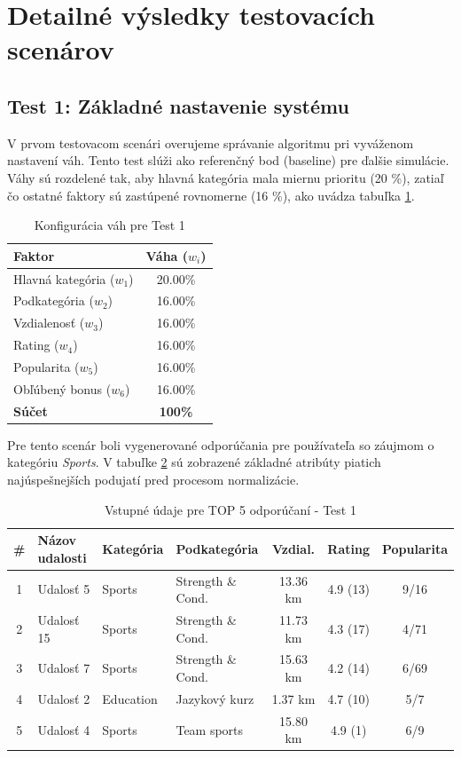 \documentclass[12pt,a4paper]{article}
\begin{document}
\section{Detailné výsledky testovacích scenárov}

\subsection{Test 1: Základné nastavenie systému}

V prvom testovacom scenári overujeme správanie algoritmu pri vyváženom nastavení váh. Tento test slúži ako referenčný bod (baseline) pre ďalšie simulácie. Váhy sú rozdelené tak, aby hlavná kategória mala miernu prioritu (20 \%), zatiaľ čo ostatné faktory sú zastúpené rovnomerne (16 \%), ako uvádza tabuľka \ref{tab:vahy_test1}.

\begin{table}[H]
\centering
\begin{tabular}{|l|c|}
\hline
\textbf{Faktor} & \textbf{Váha ($w_i$)} \\
\hline
Hlavná kategória ($w_1$) & 20.00\% \\
Podkategória ($w_2$) & 16.00\% \\
Vzdialenosť ($w_3$) & 16.00\% \\
Rating ($w_4$) & 16.00\% \\
Popularita ($w_5$) & 16.00\% \\
Obľúbený bonus ($w_6$) & 16.00\% \\
\hline
\textbf{Súčet} & \textbf{100\%} \\
\hline
\end{tabular}
\caption{Konfigurácia váh pre Test 1}
\label{tab:vahy_test1}
\end{table}

Pre tento scenár boli vygenerované odporúčania pre používateľa so záujmom o kategóriu \textit{Sports}. V tabuľke \ref{tab:data_test1} sú zobrazené základné atribúty piatich najúspešnejších podujatí pred procesom normalizácie.

\begin{table}[H]
\centering
\small
\begin{tabular}{|c|l|l|l|c|c|c|}
\hline
\textbf{\#} & \textbf{Názov udalosti} & \textbf{Kategória} & \textbf{Podkategória} & \textbf{Vzdial.} & \textbf{Rating} & \textbf{Popularita} \\
\hline
1 & Udalosť 5 & Sports    & Strength \& Cond. & 13.36 km & 4.9 (13) & 9/16 \\
2 & Udalosť 15 & Sports    & Strength \& Cond. & 11.73 km & 4.3 (17) & 4/71 \\
3 & Udalosť 7 & Sports    & Strength \& Cond. & 15.63 km & 4.2 (14) & 6/69 \\
4 & Udalosť 2 & Education & Jazykový kurz     & 1.37 km  & 4.7 (10) & 5/7 \\
5 & Udalosť 4 & Sports    & Team sports       & 15.80 km & 4.9 (1)  & 6/9 \\
\hline
\end{tabular}
\caption{Vstupné údaje pre TOP 5 odporúčaní - Test 1}
\label{tab:data_test1}
\end{table}
\end{document}
